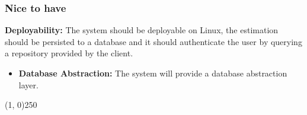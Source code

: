 \subsubsection{Nice to have}
	{\bfseries Deployability:} The system should be deployable on Linux, the estimation should be persisted to a database and it should authenticate the user by querying a repository provided by the client.
		\begin{itemize}
			\item{\bfseries Database Abstraction:}
				The system will provide a database abstraction layer.
		\end{itemize}
		\begin{center}
		\line(1, 0){250}
		\end{center}